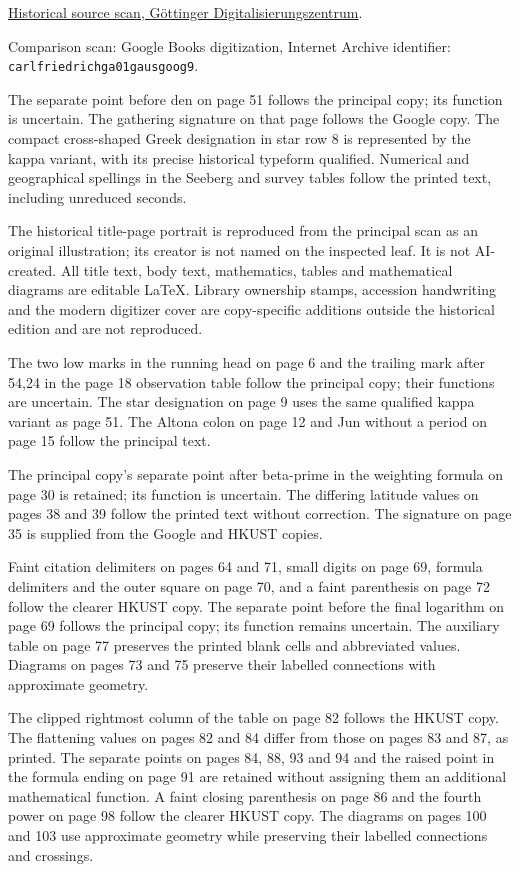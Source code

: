\noindent\href{https://gdz.sub.uni-goettingen.de/download/pdf/PPN23601515X/PPN23601515X.pdf}{Historical source scan, Göttinger Digitalisierungszentrum}.

Comparison scan: Google Books digitization, Internet Archive identifier:\\
\texttt{carlfriedrichga01gausgoog9}.

The separate point before den on page 51 follows the principal copy;
its function is uncertain. The gathering signature on that page follows
the Google copy. The compact cross-shaped Greek designation in star row
8 is represented by the kappa variant, with its precise historical
typeform qualified. Numerical and geographical spellings in the Seeberg
and survey tables follow the printed text, including unreduced seconds.

The historical title-page portrait is reproduced from the principal scan
as an original illustration; its creator is not named on the inspected leaf.
It is not AI-created. All title text, body text, mathematics, tables and
mathematical diagrams are editable LaTeX. Library ownership stamps,
accession handwriting and the modern digitizer cover are copy-specific
additions outside the historical edition and are not reproduced.

The two low marks in the running head on page 6 and the trailing mark
after 54,24 in the page 18 observation table follow the principal copy;
their functions are uncertain. The star designation on page 9 uses the
same qualified kappa variant as page 51. The Altona colon on page 12 and
Jun without a period on page 15 follow the principal text.

The principal copy's separate point after beta-prime in the weighting
formula on page 30 is retained; its function is uncertain. The differing
latitude values on pages 38 and 39 follow the printed text without correction.
The signature on page 35 is supplied from the Google and HKUST copies.

Faint citation delimiters on pages 64 and 71, small digits on page 69,
formula delimiters and the outer square on page 70, and a faint
parenthesis on page 72 follow the clearer HKUST copy. The separate point
before the final logarithm on page 69 follows the principal copy; its
function remains uncertain. The auxiliary table on page 77 preserves
the printed blank cells and abbreviated values. Diagrams on pages 73
and 75 preserve their labelled connections with approximate geometry.

The clipped rightmost column of the table on page 82 follows the HKUST
copy. The flattening values on pages 82 and 84 differ from those on
pages 83 and 87, as printed. The separate points on pages 84, 88, 93 and
94 and the raised point in the formula ending on page 91 are retained
without assigning them an additional mathematical function. A faint
closing parenthesis on page 86 and the fourth power on page 98 follow
the clearer HKUST copy. The diagrams on pages 100 and 103 use approximate
geometry while preserving their labelled connections and crossings.

